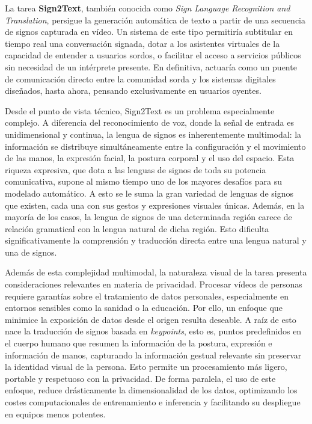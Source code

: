 La tarea \textbf{Sign2Text}, también conocida como \textit{Sign Language Recognition and Translation}, persigue la generación automática de texto a partir de una secuencia de signos capturada en vídeo.
Un sistema de este tipo permitiría subtitular en tiempo real una conversación signada, dotar a los asistentes virtuales de la capacidad de entender a usuarios sordos, o facilitar el acceso a servicios públicos sin necesidad de un intérprete presente.
En definitiva, actuaría como un puente de comunicación directo entre la comunidad sorda y los sistemas digitales diseñados, hasta ahora, pensando exclusivamente en usuarios oyentes.

Desde el punto de vista técnico, Sign2Text es un problema especialmente complejo.
A diferencia del reconocimiento de voz, donde la señal de entrada es unidimensional y continua, la lengua de signos es inherentemente multimodal: la información se distribuye simultáneamente entre la configuración y el movimiento de las manos, la expresión facial, la postura corporal y el uso del espacio.
Esta riqueza expresiva, que dota a las lenguas de signos de toda su potencia comunicativa, supone al mismo tiempo uno de los mayores desafíos para su modelado automático.
A esto se le suma la gran variedad de lenguas de signos que existen, cada una con sus gestos y expresiones visuales únicas.
Además, en la mayoría de los casos, la lengua de signos de una determinada región carece de relación gramatical con la lengua natural de dicha región.
Esto dificulta significativamente la comprensión y traducción directa entre una lengua natural y una de signos.

Además de esta complejidad multimodal, la naturaleza visual de la tarea presenta consideraciones relevantes en materia de privacidad.
Procesar vídeos de personas requiere garantías sobre el tratamiento de datos personales, especialmente en entornos sensibles como la sanidad o la educación.
Por ello, un enfoque que minimice la exposición de datos desde el origen resulta deseable.
A raíz de esto nace la traducción de signos basada en \textit{keypoints}, esto es, puntos predefinidos en el cuerpo humano que resumen la información de la postura, expresión e información de manos, capturando la información gestual relevante sin preservar la identidad visual de la persona. Esto permite un procesamiento más ligero, portable y respetuoso con la privacidad.
De forma paralela, el uso de este enfoque, reduce drásticamente la dimensionalidad de los datos, optimizando los costes computacionales de entrenamiento e inferencia y facilitando su despliegue en equipos menos potentes.

